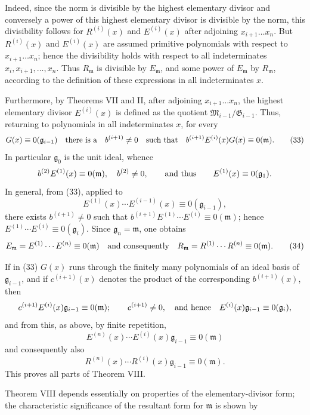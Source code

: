 \documentclass[11pt]{article}
\providecommand{\Gmod}{\mathfrak G}
\providecommand{\mideal}{\mathfrak m}
\providecommand{\gideal}{\mathfrak g}
\providecommand{\Gmod}{\mathfrak G}
\providecommand{\Mmod}{\mathfrak M}
\providecommand{\mideal}{\mathfrak m}
\providecommand{\gideal}{\mathfrak g}
\begin{document}
Indeed, since the norm is divisible by the highest elementary divisor and conversely a power of this highest elementary divisor is divisible by the norm, this divisibility follows for $R^{(i)}(x)$ and $E^{(i)}(x)$ after adjoining $x_{i+1}\ldots x_n$. But $R^{(i)}(x)$ and $E^{(i)}(x)$ are assumed primitive polynomials with respect to $x_{i+1}\ldots x_n$; hence the divisibility holds with respect to all indeterminates $x_i,x_{i+1},\ldots,x_n$. Thus $R_\mideal$ is divisible by $E_\mideal$, and some power of $E_\mideal$ by $R_\mideal$, according to the definition of these expressions in all indeterminates $x$.

Furthermore, by Theorems VII and II, after adjoining $x_{i+1}\ldots x_n$, the highest elementary divisor $E^{(i)}(x)$ is defined as the quotient $\Mmod_{i-1}/\Gmod_{i-1}$. Thus, returning to polynomials in all indeterminates $x$, for every
\begin{equation}
 G(x)\equiv0(\gideal_{i-1})
 \quad\hbox{there is a}\quad b^{(i+1)}\ne0
 \quad\hbox{such that}\quad b^{(i+1)}E^{(i)}(x)G(x)\equiv0(\mideal).
\tag{33}
\end{equation}
In particular $\gideal_0$ is the unit ideal, whence
\[
 b^{(2)}E^{(1)}(x)\equiv0(\mideal),\quad b^{(2)}\ne0,
 \qquad\hbox{and thus}\qquad E^{(1)}(x)\equiv0(\gideal_1).
\]
In general, from (33), applied to
\[
 E^{(1)}(x)\cdots E^{(i-1)}(x)\equiv0(\gideal_{i-1}),
\]
there exists $b^{(i+1)}\ne0$ such that $b^{(i+1)}E^{(1)}\cdots E^{(i)}\equiv0(\mideal)$; hence $E^{(1)}\cdots E^{(i)}\equiv0(\gideal_i)$. Since $\gideal_n=\mideal$, one obtains
\begin{equation}
 E_\mideal=E^{(1)}\cdots E^{(n)}\equiv0(\mideal)
 \quad\hbox{and consequently}\quad
 R_\mideal=R^{(1)}\cdots R^{(n)}\equiv0(\mideal).
\tag{34}
\end{equation}

If in (33) $G(x)$ runs through the finitely many polynomials of an ideal basis of $\gideal_{i-1}$, and if $c^{(i+1)}(x)$ denotes the product of the corresponding $b^{(i+1)}(x)$, then
\[
 c^{(i+1)}E^{(i)}(x)\gideal_{i-1}\equiv0(\mideal);
 \qquad c^{(i+1)}\ne0,
 \quad\hbox{and hence}\quad E^{(i)}(x)\gideal_{i-1}\equiv0(\gideal_i),
\]
and from this, as above, by finite repetition,
\[
 E^{(n)}(x)\cdots E^{(i)}(x)\gideal_{i-1}\equiv0(\mideal)
\]
and consequently also
\[
 R^{(n)}(x)\cdots R^{(i)}(x)\gideal_{i-1}\equiv0(\mideal).
\]
This proves all parts of Theorem VIII.

Theorem VIII depends essentially on properties of the elementary-divisor form; the characteristic significance of the resultant form for $\mideal$ is shown by
\end{document}
